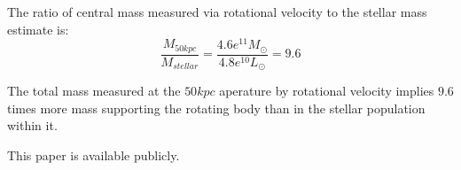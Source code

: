 \documentclass{paper}
\begin{document}
\begin{enumerate}
      The ratio of central mass measured via rotational velocity to the
      stellar mass estimate is:
      \[
        \frac{M_{50 \si{kpc}}}{M_{stellar}} = 
        \frac{4.6e^{11} M_{\odot}}{4.8e^{10} L_{\odot}} = 9.6
      \]

      The total mass measured at the \(50 \si{kpc}\) aperature by rotational
      velocity implies \(9.6\) times more mass supporting the rotating body
      than in the stellar population within it.

\end{enumerate}

This paper is available publicly.\cite{Hayden_Cosmology_Source_Repo}

\pagebreak
\printbibliography
\end{document}
